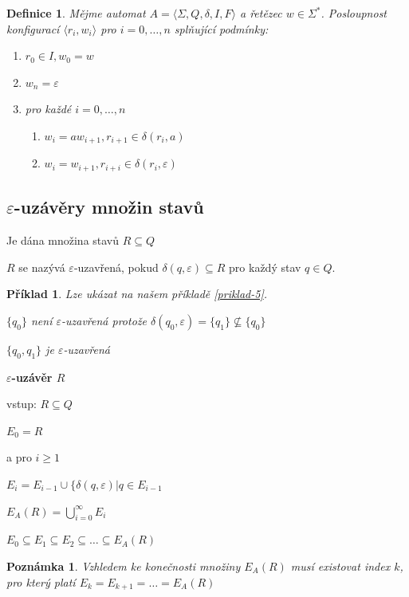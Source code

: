 \documentclass[10pt, a4paper, titlepage]{article}
\theoremstyle{note}
\newtheorem{definice}{\textbf{Definice}}
\newtheorem{priklad}{\textbf{Příklad}}
\newtheorem{poznamka}{\textbf{Poznámka}}
\begin{document}
\begin{definice}
Mějme automat $A = \langle \Sigma,Q,\delta,I,F \rangle$ a řetězec $w \in \Sigma^*$. Posloupnost konfigurací $\langle r_i,w_i \rangle$ pro $i=0,\ldots,n$ splňující podmínky:
\begin{enumerate}
\item
$r_{0} \in I, w_0=w$
\item
$w_{n} = \varepsilon$
\item
pro každé $i=0,\ldots,n$
\begin{enumerate}
\item
$w_i = aw_{i+1}, r_{i+1} \in \delta(r_i,a)$
\item
$w_i=w_{i+1} , r_{i+i} \in \delta(r_i,\varepsilon)$
\end{enumerate}
\end{enumerate}

\end{definice}

\subsection{$\varepsilon$-uzávěry množin stavů}

Je dána množina stavů $R \subseteq Q$

$R$ se nazývá $\varepsilon$-uzavřená, pokud $ \delta (q,\varepsilon) \subseteq R$ pro každý stav $ q \in Q$.

\begin{priklad}
Lze ukázat na našem příkladě \ref{priklad-5}.

$\lbrace q_0 \rbrace $ není $\varepsilon$-uzavřená protože $\delta(q_0,\varepsilon) = \lbrace q_1 \rbrace \nsubseteq \lbrace q_0 \rbrace$

$\lbrace q_0,q_1 \rbrace$ je $\varepsilon$-uzavřená
\end{priklad}

\textbf{$\varepsilon$-uzávěr $R$}

vstup: $R \subseteq Q$

\quad$E_0=R$

a pro $i \geq 1$

\quad$E_i=E_{i-1} \cup \lbrace \delta (q,\varepsilon) | q \in E_{i-1}$

\quad$E_A(R)=\bigcup_{i=0}^\infty E_i$

\quad$E_0 \subseteq E_1 \subseteq E_2 \subseteq \ldots \subseteq E_A(R)$

\begin{poznamka}
Vzhledem ke konečnosti množiny $E_A(R)$ musí existovat index $k$, pro který platí $E_k = E_{k+1} = \ldots = E_A(R)$
\end{poznamka}
\end{document}

